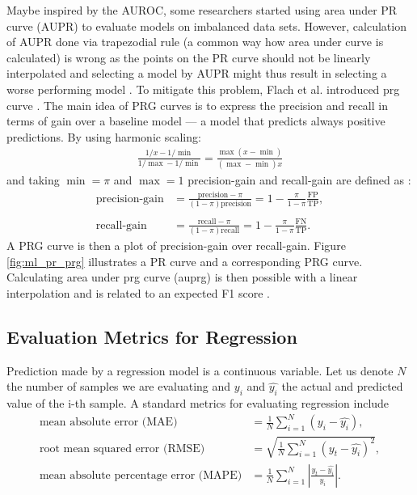 Maybe inspired by the AUROC, some researchers started using area under PR curve (AUPR) to evaluate models on imbalanced data sets.
However, calculation of AUPR done via trapezodial rule (a common way how area under curve is calculated) is wrong as the points on the PR curve should not be linearly interpolated and selecting a model by AUPR might thus result in selecting a worse performing model \cite{flach2015precision}.
To mitigate this problem, Flach et al. introduced \acrfull{prg} curve \cite{flach2015precision}.
The main idea of PRG curves is to express the precision and recall in terms of gain over a baseline model --- a model that predicts always positive predictions.
By using harmonic scaling:
\begin{align*}
    \frac{1/x - 1/\min}{1/\max - 1/\min} = \frac{\max(x-\min)}{(\max - \min)x}
\end{align*}
and taking $\min = \pi$ and $\max = 1$ precision-gain and recall-gain are defined as \cite{flach2015precision}:
\begin{align*}
    \text{precision-gain} &= \frac{\text{precision} - \pi}{(1 - \pi)\text{precision}} = 1 - \frac{\pi}{1 - \pi}\frac{\text{FP}}{\text{TP}}, \\\\
    \text{recall-gain} &= \frac{\text{recall} - \pi}{(1 - \pi)\text{recall}} = 1 - \frac{\pi}{1 - \pi}\frac{\text{FN}}{\text{TP}}.
\end{align*}
A PRG curve is then a plot of precision-gain over recall-gain.
Figure \ref{fig:ml_pr_prg} illustrates a PR curve and a corresponding PRG curve.
Calculating area under \acrshort{prg} curve (\acrshort{auprg}) is then possible with a linear interpolation and is related to an expected F1 score \cite{flach2015precision}.

\subsection{Evaluation Metrics for Regression}

Prediction made by a regression model is a continuous variable.
Let us denote $N$ the number of samples we are evaluating and $y_i$ and $\hat{y_i}$ the actual and predicted value of the i-th sample.
A standard metrics for evaluating regression include
\begin{align*}
    \text{mean absolute error (MAE)} &= \frac{1}{N} \sum_{i=1}^{N}(y_i - \hat{y_i}),\\
    \text{root mean squared error (RMSE)} &= \sqrt{\frac{1}{N}\sum_{i=1}^{N}{(y_t - \hat{y_i})^2}},\\
    \text{mean absolute percentage error (MAPE)} &= \frac{1}{N} \sum_{i=1}^{N}\left|\frac{y_t - \hat{y_i}}{y_i}\right|.\\
\end{align*}

